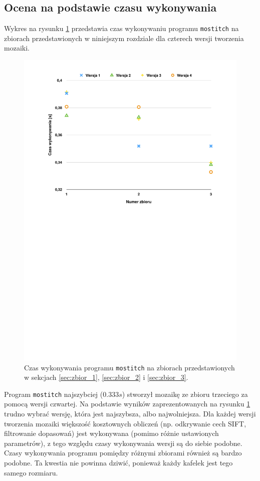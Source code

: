 \subsection{Ocena na podstawie czasu wykonywania}
\label{sec:wyniki_eksperymentow:czas_wykonywania}

Wykres na rysunku \ref{fig:wyniki_eksperymentow:czas_wykonywania} przedstawia czas wykonywaniu programu \texttt{mostitch} na zbiorach przedstawionych w niniejszym rozdziale dla czterech wersji tworzenia mozaiki.

\begin{figure}[htb]
  \centering
  \includegraphics[width=12cm]{gfx/czas_wykonywania}
  \caption{Czas wykonywania programu \texttt{mostitch} na zbiorach przedstawionych w sekcjach \ref{sec:zbior_1}, \ref{sec:zbior_2} i \ref{sec:zbior_3}.}
  \label{fig:wyniki_eksperymentow:czas_wykonywania}
\end{figure}

Program \texttt{mostitch} najszybciej ($0.333s$) stworzył mozaikę ze zbioru trzeciego za pomocą wersji czwartej. Na podstawie wyników zaprezentowanych na rysunku \ref{fig:wyniki_eksperymentow:czas_wykonywania} trudno wybrać wersję, która jest najszybsza, albo najwolniejsza. Dla każdej wersji tworzenia mozaiki większość kosztownych obliczeń (np. odkrywanie cech SIFT, filtrowanie dopasowań) jest wykonywana (pomimo różnie ustawionych parametrów), z tego względu czasy wykonywania wersji są do siebie podobne. Czasy wykonywania programu pomiędzy różnymi zbiorami również są bardzo podobne. Ta kwestia nie powinna dziwić, ponieważ każdy kafelek jest tego samego rozmiaru. 

